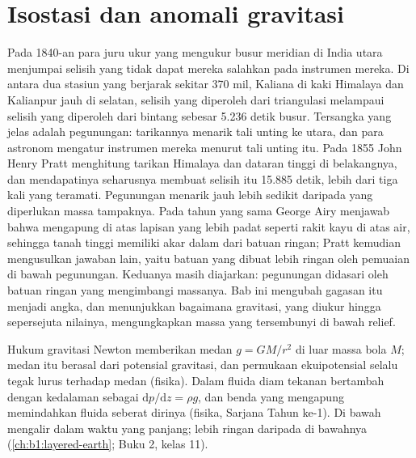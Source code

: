 \chapter{Isostasi dan anomali gravitasi}\label{ch:b1:isostasy-gravity}

Pada 1840-an para juru ukur yang mengukur busur meridian di India utara menjumpai selisih yang tidak dapat mereka salahkan pada instrumen mereka. Di antara dua stasiun yang berjarak sekitar 370 mil, Kaliana di kaki Himalaya dan Kalianpur jauh di selatan, selisih  yang diperoleh dari triangulasi melampaui selisih yang diperoleh dari bintang sebesar 5.236 detik busur. Tersangka yang jelas adalah pegunungan: tarikannya menarik tali unting ke utara, dan para astronom mengatur instrumen mereka menurut tali unting itu. Pada 1855 John Henry Pratt menghitung tarikan Himalaya dan dataran tinggi di belakangnya, dan mendapatinya seharusnya membuat selisih itu 15.885 detik, lebih dari tiga kali yang teramati. Pegunungan menarik jauh lebih sedikit daripada yang diperlukan massa tampaknya. Pada tahun yang sama George Airy menjawab bahwa  mengapung di atas lapisan yang lebih padat seperti rakit kayu di atas air, sehingga tanah tinggi memiliki akar dalam dari batuan ringan; Pratt kemudian mengusulkan jawaban lain, yaitu batuan yang dibuat lebih ringan oleh pemuaian di bawah pegunungan. Keduanya masih diajarkan: pegunungan didasari oleh batuan ringan yang mengimbangi massanya. Bab ini mengubah gagasan itu menjadi angka, dan menunjukkan bagaimana gravitasi, yang diukur hingga sepersejuta nilainya, mengungkapkan massa yang tersembunyi di bawah relief.

\begin{recall}
Hukum gravitasi Newton memberikan medan $g = GM/r^2$ di luar massa bola $M$; medan itu berasal dari potensial gravitasi, dan permukaan ekuipotensial selalu tegak lurus terhadap medan (fisika). Dalam fluida diam tekanan bertambah dengan kedalaman sebagai $\mathrm dp/\mathrm dz = \rho g$, dan benda yang mengapung memindahkan fluida seberat dirinya (fisika, Sarjana Tahun ke-1). Di bawah   mengalir dalam waktu yang panjang;  lebih ringan daripada  di bawahnya (\cref{ch:b1:layered-earth}; Buku 2, kelas 11).
\end{recall}

